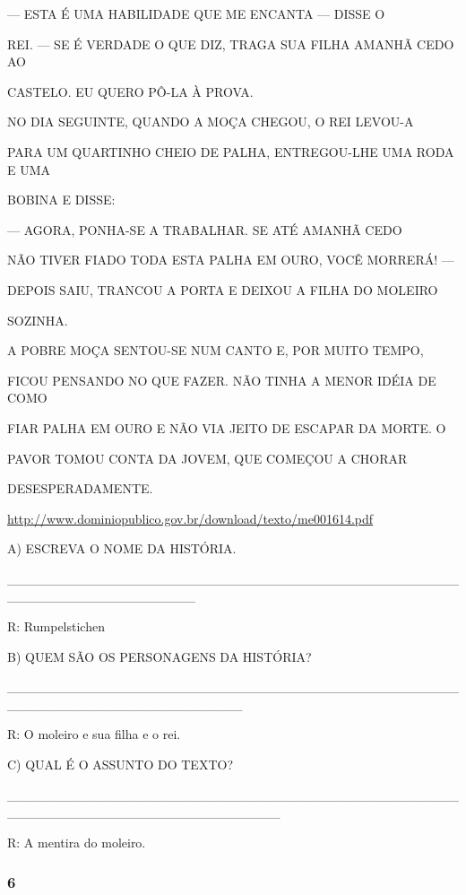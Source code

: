 --- ESTA É UMA HABILIDADE QUE ME ENCANTA --- DISSE O

REI. --- SE É VERDADE O QUE DIZ, TRAGA SUA FILHA AMANHÃ CEDO AO

CASTELO. EU QUERO PÔ-LA À PROVA.

NO DIA SEGUINTE, QUANDO A MOÇA CHEGOU, O REI LEVOU-A

PARA UM QUARTINHO CHEIO DE PALHA, ENTREGOU-LHE UMA RODA E UMA

BOBINA E DISSE:

--- AGORA, PONHA-SE A TRABALHAR. SE ATÉ AMANHÃ CEDO

NÃO TIVER FIADO TODA ESTA PALHA EM OURO, VOCÊ MORRERÁ! ---

DEPOIS SAIU, TRANCOU A PORTA E DEIXOU A FILHA DO MOLEIRO

SOZINHA.

A POBRE MOÇA SENTOU-SE NUM CANTO E, POR MUITO TEMPO,

FICOU PENSANDO NO QUE FAZER. NÃO TINHA A MENOR IDÉIA DE COMO

FIAR PALHA EM OURO E NÃO VIA JEITO DE ESCAPAR DA MORTE. O

PAVOR TOMOU CONTA DA JOVEM, QUE COMEÇOU A CHORAR

DESESPERADAMENTE.

\url{http://www.dominiopublico.gov.br/download/texto/me001614.pdf}

A) ESCREVA O NOME DA HISTÓRIA.

\_\_\_\_\_\_\_\_\_\_\_\_\_\_\_\_\_\_\_\_\_\_\_\_\_\_\_\_\_\_\_\_\_\_\_\_\_\_\_\_\_\_\_\_\_\_\_\_\_\_\_\_\_\_\_\_\_\_\_\_\_\_\_\_\_\_\_\_

R: Rumpelstichen

B) QUEM SÃO OS PERSONAGENS DA HISTÓRIA?

\_\_\_\_\_\_\_\_\_\_\_\_\_\_\_\_\_\_\_\_\_\_\_\_\_\_\_\_\_\_\_\_\_\_\_\_\_\_\_\_\_\_\_\_\_\_\_\_\_\_\_\_\_\_\_\_\_\_\_\_\_\_\_\_\_\_\_\_\_\_\_\_\_

R: O moleiro e sua filha e o rei.

C) QUAL É O ASSUNTO DO TEXTO?

\_\_\_\_\_\_\_\_\_\_\_\_\_\_\_\_\_\_\_\_\_\_\_\_\_\_\_\_\_\_\_\_\_\_\_\_\_\_\_\_\_\_\_\_\_\_\_\_\_\_\_\_\_\_\_\_\_\_\_\_\_\_\_\_\_\_\_\_\_\_\_\_\_\_\_\_\_

R: A mentira do moleiro.

\subsubsection{6 }\label{section-60}

